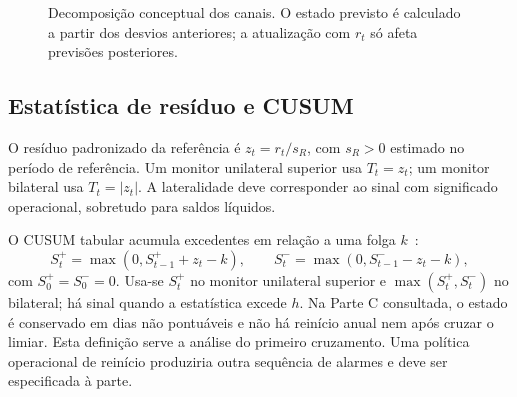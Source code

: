 \begin{figure}[htbp]
\centering
{}
\caption{Decomposição conceptual dos canais. O estado previsto é calculado a partir dos desvios anteriores; a atualização com $r_t$ só afeta previsões posteriores.}
\label{fig:mat-canais}
\end{figure}

\subsection{Estatística de resíduo e CUSUM}
\label{sec:mat-cusum}
O resíduo padronizado da referência é $z_t=r_t/s_R$, com $s_R>0$ estimado no período de referência. Um monitor unilateral superior usa $T_t=z_t$; um monitor bilateral usa $T_t=|z_t|$. A lateralidade deve corresponder ao sinal com significado operacional, sobretudo para saldos líquidos.

O CUSUM tabular acumula excedentes em relação a uma folga $k$~\parencite{Page1954}:
\begin{equation}
S_t^+=\max(0,S_{t-1}^++z_t-k),
\qquad S_t^-=\max(0,S_{t-1}^--z_t-k),
\label{eq:mat-cusum}
\end{equation}
com $S_0^+=S_0^-=0$. Usa-se $S_t^+$ no monitor unilateral superior e $\max(S_t^+,S_t^-)$ no bilateral; há sinal quando a estatística excede $h$. Na Parte C consultada, o estado é conservado em dias não pontuáveis e não há reinício anual nem após cruzar o limiar. Esta definição serve a análise do primeiro cruzamento. Uma política operacional de reinício produziria outra sequência de alarmes e deve ser especificada à parte.

